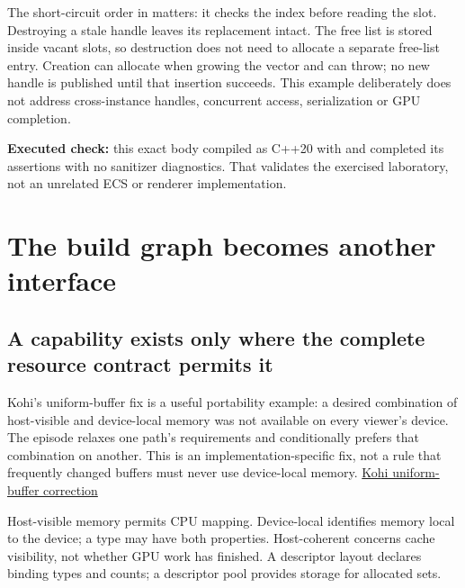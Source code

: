 The short-circuit order in  matters: it checks the index before reading the slot. Destroying a stale handle leaves its replacement intact. The free list is stored inside vacant slots, so destruction does not need to allocate a separate free-list entry. Creation can allocate when growing the vector and can throw; no new handle is published until that insertion succeeds. This example deliberately does not address cross-instance handles, concurrent access, serialization or GPU completion.

\textbf{Executed check:} this exact body compiled as C++20 with  and completed its assertions with no sanitizer diagnostics. That validates the exercised laboratory, not an unrelated ECS or renderer implementation.

\section{The build graph becomes another interface}\label{05-engine-i-ch008-the-build-graph-becomes-another-interface}

\hypertarget{05-engine-i-ch008-the-build-graph-becomes-another-interface}{}

\subsection{A capability exists only where the complete resource contract permits it}\label{05-engine-i-ch008-a-capability-exists-only-where-the-complete-resource-contract-permits-it}

\hypertarget{05-engine-i-ch008-a-capability-exists-only-where-the-complete-resource-contract-permits-it}{}

Kohi's uniform-buffer fix is a useful portability example: a desired combination of host-visible and device-local memory was not available on every viewer's device. The episode relaxes one path's requirements and conditionally prefers that combination on another. This is an implementation-specific fix, not a rule that frequently changed buffers must never use device-local memory. \href{https://www.youtube.com/watch?v=aD6fZ7tQSAY}{Kohi uniform-buffer correction}

Host-visible memory permits CPU mapping. Device-local identifies memory local to the device; a type may have both properties. Host-coherent concerns cache visibility, not whether GPU work has finished. A descriptor layout declares binding types and counts; a descriptor pool provides storage for allocated sets.

